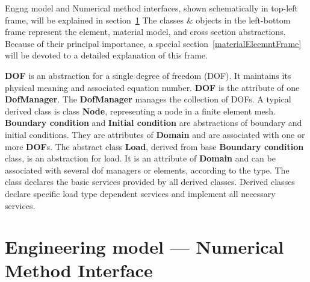 \documentclass[a4paper]{article}
\newcommand{\class}[1]{{\bf #1}}
\begin{document}

Engng model and Numerical method interfaces, shown schematically in
top-left frame, will be explained in section~\ref{engngNummetsection}
The classes \& objects in the left-bottom frame represent the element,
material model, and cross section abstractions. Because of their
principal importance, a special 
section~\ref{materialEleemntFrame} will be devoted to a detailed
explanation of this frame. 

\class{DOF} is an abstraction for a single degree of freedom (DOF). It maintains
its physical meaning and associated equation number. \class{DOF} is
the attribute of
one \class{DofManager}. The \class{DofManager} manages the collection
of DOFs. A typical
derived class is class \class{Node}, representing a node in a finite element mesh.
\class{Boundary condition} and \class{Initial condition} are abstractions of boundary and
initial conditions. They are attributes of \class{Domain} and are associated
with one or more \class{DOF}s. The abstract class \class{Load}, derived from base \class{Boundary
condition} class, is an abstraction for load. It is an attribute of \class{Domain}
and can be associated with several dof managers or elements, according to
the type. The class declares the basic services provided by
all derived classes. Derived classes declare specific load type dependent
services and implement all necessary services.



\section {Engineering model --- Numerical Method Interface}
\label{engngNummetsection}
\end{document}
